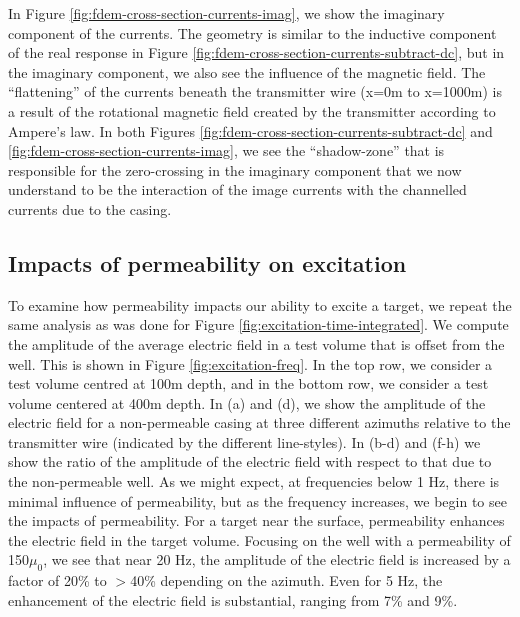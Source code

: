 

In Figure \ref{fig:fdem-cross-section-currents-imag}, we show the imaginary component of the currents. The geometry is similar to the inductive component of the real response in Figure \ref{fig:fdem-cross-section-currents-subtract-dc}, but in the imaginary component, we also see the influence of the magnetic field. The ``flattening'' of the currents beneath the transmitter wire (x=0m to x=1000m) is a result of the rotational magnetic field created by the transmitter according to Ampere's law. In both Figures \ref{fig:fdem-cross-section-currents-subtract-dc} and \ref{fig:fdem-cross-section-currents-imag}, we see the ``shadow-zone'' that is responsible for the zero-crossing in the imaginary component that we now understand to be the interaction of the image currents with the channelled currents due to the casing.



\subsection{Impacts of permeability on excitation}
To examine how permeability impacts our ability to excite a target, we repeat the same analysis as was done for Figure \ref{fig:excitation-time-integrated}. We compute the amplitude of the average electric field in a test volume that is offset from the well. This is shown in Figure \ref{fig:excitation-freq}. In the top row, we consider a test volume centred at 100m depth, and in the bottom row, we consider a test volume centered at 400m depth. In (a) and (d), we show the amplitude of the electric field for a non-permeable casing at three different azimuths relative to the transmitter wire (indicated by the different line-styles). In (b-d) and (f-h) we show the ratio of the amplitude of the electric field with respect to that due to the non-permeable well. As we might expect, at frequencies below 1 Hz, there is minimal influence of permeability, but as the frequency increases, we begin to see the impacts of permeability. For a target near the surface, permeability enhances the electric field in the target volume. Focusing on the well with a permeability of 150$\mu_0$, we see that near 20 Hz, the amplitude of the electric field is increased by a factor of 20\% to $>$40\% depending on the azimuth. Even for 5 Hz, the enhancement of the electric field is substantial, ranging from 7\% and 9\%.


